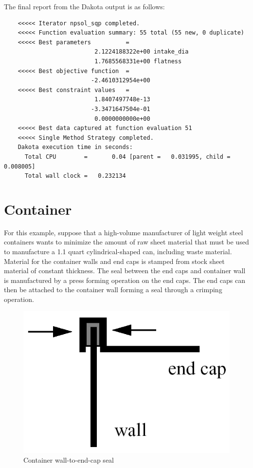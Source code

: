 The final report from the Dakota output is as follows:
\begin{small}
\begin{verbatim}
    <<<<< Iterator npsol_sqp completed.					 
    <<<<< Function evaluation summary: 55 total (55 new, 0 duplicate)	 
    <<<<< Best parameters          =					 
                          2.1224188322e+00 intake_dia			 
                          1.7685568331e+00 flatness
    <<<<< Best objective function  =					 
                         -2.4610312954e+00
    <<<<< Best constraint values   =		 
                          1.8407497748e-13
                         -3.3471647504e-01
                          0.0000000000e+00
    <<<<< Best data captured at function evaluation 51
    <<<<< Single Method Strategy completed.
    Dakota execution time in seconds:					 
      Total CPU        =       0.04 [parent =   0.031995, child =   0.008005]
      Total wall clock =   0.232134
\end{verbatim}
\end{small}

\clearpage
\section{Container}\label{additional:container}

For this example, suppose that a high-volume manufacturer of light
weight steel containers wants to minimize the amount of raw sheet
material that must be used to manufacture a 1.1 quart
cylindrical-shaped can, including waste material. Material for the
container walls and end caps is stamped from stock sheet material of
constant thickness. The seal between the end caps and container wall
is manufactured by a press forming operation on the end caps. The end
caps can then be attached to the container wall forming a seal through
a crimping operation.

\begin{figure}[hb]
  \centering
  \includegraphics[scale=0.4]{images/end_cap}
  \caption{Container wall-to-end-cap seal}
  \label{additional:figure01}
\end{figure}

